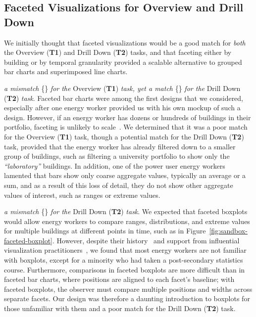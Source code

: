 \documentclass[journal]{vgtc}                %
\newcommand*\match{\textcolor{darkGreen}{\ding{52}}}
\newcommand*\mismatch{\textcolor{red}{\ding{54}}}
\newcommand{\bstart}[1]{\vspace{1mm} \noindent{\textbf{#1:}}}
\begin{document}

\subsection{Faceted Visualizations for Overview and Drill Down}
\label{design-faceting}


We initially thought that faceted visualizations would be a good match for {\it both} the Overview ({\bf T1}) and Drill Down ({\bf T2}) tasks, and that faceting either by building or by temporal granularity provided a scalable alternative to grouped bar charts and superimposed line charts.

\bstart{Faceted bar charts} {\it a mismatch} \{\mismatch\} {\it for the} Overview ({\bf T1}) {\it task, yet a match} \{\match\} {\it for the} Drill Down ({\bf T2}) {\it task}.
Faceted bar charts were among the first designs that we considered, especially after one energy worker provided us with his own mockup of such a design.
However, if an energy worker has dozens or hundreds of buildings in their portfolio, faceting is unlikely to scale~\cite{Javed2010}. 
We determined that it was a poor match for the Overview ({\bf T1}) task, though a potential match for the Drill Down ({\bf T2}) task, provided that the energy worker has already filtered down to a smaller group of buildings, such as filtering a university portfolio to show only the {\it ``laboratory''} buildings.
In addition, one of the power user energy workers lamented that bars show only coarse aggregate values, typically an average or a sum, and as a result of this loss of detail, they do not show other aggregate values of interest, such as ranges or extreme values.

\bstart{Faceted boxplots} {\it a mismatch} \{\mismatch\} {\it for the} Drill Down ({\bf T2}) {\it task}.
We expected that faceted boxplots would allow energy workers to compare ranges, distributions, and extreme values for multiple buildings at different points in time, such as in Figure~\ref{fig:sandbox-faceted-boxplot}.
However, despite their history~\cite{Wickham2011} and support from influential visualization practitioners~\cite{Few2014}, we found that most energy workers are not familiar with boxplots, except for a minority who had taken a post-secondary statistics course.
Furthermore, comparisons in faceted boxplots are more difficult than in faceted bar charts, where positions are aligned to each facet's baseline; with faceted boxplots, the observer must compare multiple positions and widths across separate facets. 
Our design was therefore a daunting introduction to boxplots for those unfamiliar with them and a poor match for the Drill Down ({\bf T2}) task.
\end{document}
